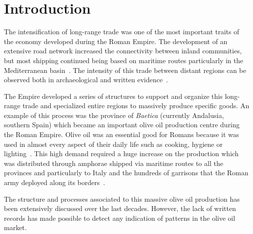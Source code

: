 \documentclass[review]{elsarticle}
\begin{document}
\section{Introduction}

The intensification of long-range trade was one of the most important traits of the economy developed during the Roman Empire. The development of an extensive road network increased the connectivity between inland communities, but most shipping continued being based on maritime routes particularly in the Mediterranean basin~\citep{temin_market_2001,bevan_mediterranean_2014}. The intensity of this trade between distant regions can be observed both in archaeological and written evidence~\citep{rodriguez_baetican_1998}.


The Empire developed a series of structures to support and organize this long-range trade and specialized entire regions to massively produce specific goods. An example of this process was the province of \textit{Baetica} (currently Andalusia, southern Spain) which became an important olive oil production centre during the Roman Empire. Olive oil was an essential good for Romans because it was used in almost every aspect of their daily life such as cooking, hygiene or lighting~\citep{mattingly_d.j._oil_1988}. This high demand required a huge increase on the production which was distributed through amphorae shipped via maritime routes to all the provinces and particularly to Italy and the hundreds of garrisons that the Roman army deployed along its borders~\citep{blazquez_exportacion_1980}. 

The structure and processes associated to this massive olive oil production has been extensively discussed over the last decades\citep{rodriguez_economioleicola_1977, Chic_hispania_1997,millet_anforas_1998}. 
However, the lack of written records has made possible to detect any indication of patterns in the olive oil market.
\end{document}
